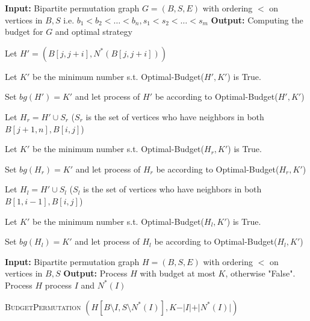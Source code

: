 \documentclass[letterpaper,11pt,abstracton]{scrartcl}
\begin{document}
\begin{algorithm}[H]
\begin{algorithmic}[1]

\State \textbf{Input:} Bipartite permutation graph $G=(B,S,E)$ with ordering $<$ on vertices in $B,S$
i.e. $b_1 < b_2 < \dots < b_{n}, s_1  < s_2 <  \dots < s_{m}$\;
\State \textbf{Output:} Computing the budget for $G$ and optimal strategy\;



 \State Let $H'=(B[j,j+i],N^*(B[j,j+i]))$ 
 
 \State Let $K'$ be the minimum number s.t. Optimal-Budget($H',K'$) is True. 
 
 \State Set $bg(H')=K'$ and let process of $H'$ be according to Optimal-Budget($H',K'$) 
 


   \State Let $H_r= H' \cup S_r$ ($S_r$ is the set of vertices who have neighbors in both $B[j+1,n],B[i,j]$)   

    \State Let $K'$ be the minimum number s.t. Optimal-Budget($H_r,K'$) is True. 
    
    \State Set $bg(H_r)=K'$ and let process of $H_r$ be according to Optimal-Budget($H_r,K'$)
    


 


   \State Let $H_l= H' \cup S_l$ ($S_l$ is the set of vertices who have neighbors in both $B[1,i-1],B[i,j]$)

    \State Let $K'$ be the minimum number s.t. Optimal-Budget($H_l,K'$) is True. 
    
    \State Set $bg(H_l)=K'$ and let process of $H_l$ be according to Optimal-Budget($H_l,K'$)
    


\EndFor

\EndFor 

\Statex 
{} 
\State \textbf{Input:} Bipartite permutation graph $H=(B,S,E)$ with ordering $<$ on vertices in $B,S$
\State \textbf{Output:} Process $H$ with budget at most $K$, otherwise "False".\;
\Return Process $H$\;
\EndIf
{}
     process $I$ and $N^*(I)$
     
     \State \Return \textsc{BudgetPermutation} $(H[B \setminus I,S \setminus N^{*}(I)],K-\vert I\vert +\vert N^{*}(I)\vert)$\;
\EndIf


\end{algorithmic}
\end{algorithm}
\end{document}
